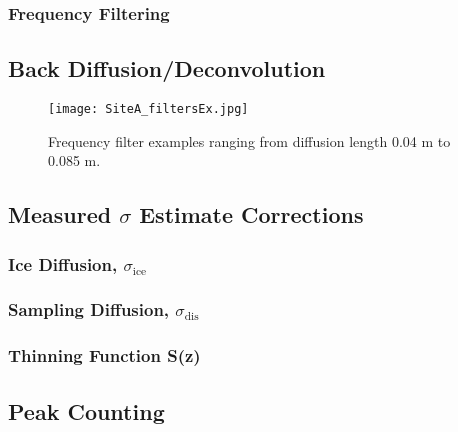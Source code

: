 \documentclass[../../CompleteThesis/Complete_1stDraft.tex]{subfiles}
\begin{document}
\subsubsection[Frequency Filters]{Frequency Filtering}
\label{Subsubsec:Method_FirstSigmaEstimate_BackDiffusion_FrequencyFilters}

\subsection[Back Diffusion]{Back Diffusion/Deconvolution}
\label{Subsec:Method_FirstSigmaEstimate_BackDiffusion}
\begin{figure}[h]
	\centering
	\texttt{[image: SiteA\_filtersEx.jpg]}
	\caption[Frequency filters example, Site A]{Frequency filter examples ranging from diffusion length 0.04 m to 0.085 m.}
	\label{fig:SiteA_filtersEx}
\end{figure}

\subsection{Measured $\sigma$ Estimate Corrections}
\label{Subsec:Method_FirstSigmaEstimate_Correction}


\subsubsection[Ice diffusion]{Ice Diffusion, $\sigma_{\text{ice}}$}
\label{Subsubsec:Method_FirstSigmaEstimate_Correction_IceDiffusion}

\subsubsection[Sampling diffusion]{Sampling Diffusion, $\sigma_{\text{dis}}$}
\label{Subsubsec:Method_FirstSigmaEstimate_Correction_SamplingDiffusion}


\subsubsection[Thinning Function]{Thinning Function S(z)}
\label{Subsubsec:Method_FirstSigmaEstimate_Correction_ThinningFunction}






\subsection[Peak Counting]{Peak Counting}
\label{Subsec:Method_FirstSigmaEstimate_PeakCounting}
\end{document}
